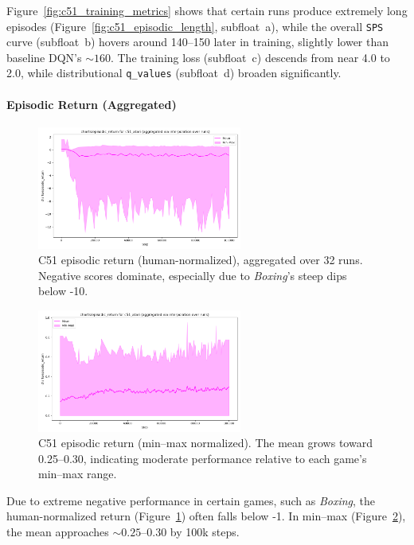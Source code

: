 Figure~\ref{fig:c51_training_metrics} shows that certain runs produce extremely long episodes 
(Figure~\ref{fig:c51_episodic_length}, subfloat~a), 
while the overall \texttt{SPS} curve (subfloat~b) hovers around 140--150 later in training, 
slightly lower than baseline DQN’s $\sim160$. 
The training loss (subfloat~c) descends from near 4.0 to 2.0, 
while distributional \texttt{q\_values} (subfloat~d) broaden significantly.

\paragraph{Episodic Return (Aggregated)}

\begin{figure}
	\centering
	\includegraphics[width=0.6\textwidth]{figures/c51/charts_episodic_return_human_c51_atari.png}
	\caption{C51 episodic return (human-normalized), aggregated over 32 runs. 
		Negative scores dominate, especially due to \emph{Boxing}’s steep dips below -10.}
	\label{fig:c51_return_human}
\end{figure}

\begin{figure}
	\centering
	\includegraphics[width=0.6\textwidth]{figures/c51/charts_episodic_return_minmax_c51_atari.png}
	\caption{C51 episodic return (min--max normalized). 
		The mean grows toward 0.25--0.30, indicating moderate performance relative to each game’s min--max range.}
	\label{fig:c51_return_minmax}
\end{figure}

Due to extreme negative performance in certain games, such as \emph{Boxing}, 
the human-normalized return (Figure~\ref{fig:c51_return_human}) 
often falls below -1. In min--max (Figure~\ref{fig:c51_return_minmax}), 
the mean approaches $\sim0.25$--$0.30$ by 100k steps.

